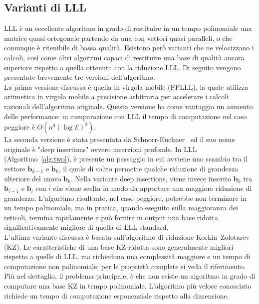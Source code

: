 \subsection{Varianti di LLL}

LLL è un eccellente algoritmo in grado di restituire in un tempo polinomiale una matrice 
quasi ortogonale partendo da una con vettori quasi paralleli, o che comunque è ritenibile 
di bassa qualità. Esistono però varianti che ne velocizzano i calcoli, 
così come altri algoritmi capaci di restituire una base di qualità ancora superiore 
rispetto a quella ottenuta con la riduzione LLL. Di seguito vengono presentate 
brevemente tre versioni dell'algoritmo. 
\\
La prima versione discussa è quella in virgola mobile (FPLLL)\cite{FPLLL05}, la quale 
utilizza aritmetica in virgola mobile a 
precisione arbitraria per accelerare i calcoli razionali dell'algoritmo originale. 
Questa versione ha come vantaggio un aumento delle performance: in comparazione con LLL
il tempo di computazione nel caso peggiore è $O(n^3 (\log\mathcal{E})^2)$. 
\\ 
La seconda versione è stata presentata da Schnorr-Euchner~\cite{DEEPLLL94} ed il suo nome
originale è "deep insertions" ovvero inserzioni profonde. In LLL (Algoritmo~\ref*{alg:two}),
è presente un passaggio in cui avviene uno scambio tra il vettore 
$\mathbf{b}_{k-1}$ e $\mathbf{b}_{k}$, il quale di solito permette qualche riduzione di grandezza
ulteriore del nuovo $\mathbf{b}_{k}$. Nella variante deep insertions, viene invece inserito
$\mathbf{b}_{k}$ tra $\mathbf{b}_{i-1}$ e $\mathbf{b}_{i}$ con $i$ che viene scelta in modo
da apportare una maggiore riduzione di grandezza. L'algoritmo risultante, nel caso peggiore,
potrebbe non terminare in un tempo polinomiale, ma in pratica, quando eseguito sulla maggioranza
dei reticoli, termina rapidamente e può fornire in output una base ridotta 
significativamente migliore di quella di LLL standard. 
\\
L'ultima variante discussa è basata sull'algoritmo di riduzione 
Korkin–Zolotarev (KZ)\cite[Sezione 18.5]{Galbraith18}. Le caratteristiche di una base KZ-ridotta
sono generalmente migliori rispetto a quelle di LLL, ma richiedono una complessità maggiore
e un tempo di computazione non polinomiale; per le proprietà complete si veda il riferimento. 
Più nel dettaglio, il problema principale, è che non esiste un algoritmo in grado di computare
una base KZ in tempo polinomiale. L'algoritmo più veloce conosciuto richiede un tempo
di computazione esponenziale rispetto alla dimensione. 
